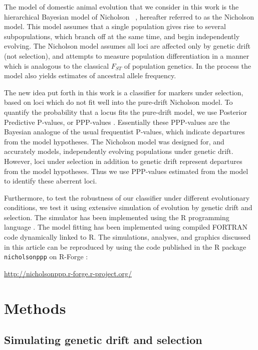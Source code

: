 \documentclass[a4paper,12pt]{article}
\begin{document}
The model of domestic animal evolution that we consider in this work
is the hierarchical Bayesian model of Nicholson \etal\
\cite{nicholson}, hereafter referred to as the Nicholson model. This
model assumes that a single population gives rise to several
subpopulations, which branch off at the same time, and begin
independently evolving. The Nicholson model assumes all loci are
affected only by genetic drift (not selection), and attempts to
measure population differentiation in a manner which is analogous to
the classical $F_{ST}$ of population genetics. In the process the
model also yields estimates of ancestral allele frequency.

The new idea put forth in this work is a classifier for markers under
selection, based on loci which do not fit well into the pure-drift
Nicholson model. To quantify the probability that a locus fits the
pure-drift model, we use Posterior Predictive P-values, or PPP-values
\cite{pppvalues,foulley-gautier}. Essentially these PPP-values are the
Bayesian analogue of the usual frequentist P-values, which indicate
departures from the model hypotheses. The Nicholson model was designed
for, and accurately models, independently evolving populations under
genetic drift. However, loci under selection in addition to genetic
drift represent departures from the model hypotheses. Thus we use
PPP-values estimated from the model to identify these aberrent loci.

Furthermore, to test the robustness of our classifier under different
evolutionary conditions, we test it using extensive simulation of
evolution by genetic drift and selection. The simulator has been
implemented using the R programming language \cite{R}. The model
fitting has been implemented using compiled FORTRAN code dynamically
linked to R. The simulations, analyses, and graphics discussed in this
article can be reproduced by using the code published in the R package
\texttt{nicholsonppp} on R-Forge \cite{R-Forge}:

 \url{http://nicholsonppp.r-forge.r-project.org/}

\section{Methods}

\subsection{Simulating genetic drift and selection}
\end{document}
